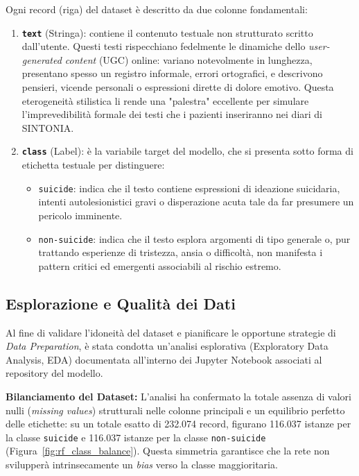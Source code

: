 Ogni record (riga) del dataset è descritto da due colonne fondamentali:
\begin{enumerate}
    \item \textbf{\texttt{text}} (Stringa): contiene il contenuto testuale non strutturato scritto dall'utente. Questi testi rispecchiano fedelmente le dinamiche dello \textit{user-generated content} (UGC) online: variano notevolmente in lunghezza, presentano spesso un registro informale, errori ortografici, e descrivono pensieri, vicende personali o espressioni dirette di dolore emotivo. Questa eterogeneità stilistica li rende una "palestra" eccellente per simulare l'imprevedibilità formale dei testi che i pazienti inseriranno nei diari di SINTONIA.
    \item \textbf{\texttt{class}} (Label): è la variabile target del modello, che si presenta sotto forma di etichetta testuale per distinguere:
    \begin{itemize}
        \item \texttt{suicide}: indica che il testo contiene espressioni di ideazione suicidaria, intenti autolesionistici gravi o disperazione acuta tale da far presumere un pericolo imminente.
        \item \texttt{non-suicide}: indica che il testo esplora argomenti di tipo generale o, pur trattando esperienze di tristezza, ansia o difficoltà, non manifesta i pattern critici ed emergenti associabili al rischio estremo.
    \end{itemize}
\end{enumerate}

\subsection{Esplorazione e Qualità dei Dati}
\label{subsec:esplorazione_red_flag}

Al fine di validare l'idoneità del dataset e pianificare le opportune strategie di \textit{Data Preparation}, è stata condotta un'analisi esplorativa (Exploratory Data Analysis, EDA) documentata all'interno dei Jupyter Notebook associati al repository del modello. 

\textbf{Bilanciamento del Dataset:} L'analisi ha confermato la totale assenza di valori nulli (\textit{missing values}) strutturali nelle colonne principali e un equilibrio perfetto delle etichette: su un totale esatto di 232.074 record, figurano 116.037 istanze per la classe \texttt{suicide} e 116.037 istanze per la classe \texttt{non-suicide} (Figura~\ref{fig:rf_class_balance}). Questa simmetria garantisce che la rete non svilupperà intrinsecamente un \textit{bias} verso la classe maggioritaria.


